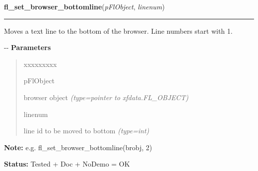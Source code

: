 \hspace{.8\funcindent}\begin{boxedminipage}{\funcwidth}

    \raggedright \textbf{fl\_set\_browser\_bottomline}(\textit{pFlObject}, \textit{linenum})

    \vspace{-1.5ex}

    \rule{\textwidth}{0.5\fboxrule}
\setlength{\parskip}{2ex}

Moves a text line to the bottom of the browser. Line numbers start with
1.

-{}-
\setlength{\parskip}{1ex}
      \textbf{Parameters}
      \vspace{-1ex}

      \begin{quote}
        \begin{Ventry}{xxxxxxxxx}

          \item[pFlObject]


browser object
            {\it (type=pointer to xfdata.FL\_OBJECT)}

          \item[linenum]


line id to be moved to bottom
            {\it (type=int)}

        \end{Ventry}

      \end{quote}

\textbf{Note:} 
e.g. fl\_set\_browser\_bottomline(brobj, 2)


\textbf{Status:} 
Tested + Doc + NoDemo = OK


    \end{boxedminipage}

    \label{xformslib:flbrowser:fl_set_browser_fontsize}

    \vspace{0.5ex}

